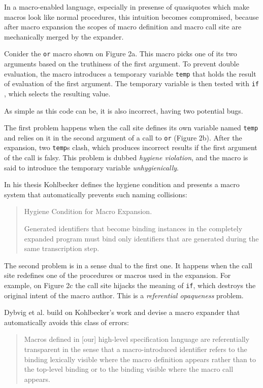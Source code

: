 \documentclass[10pt,journal,a4paper]{IEEEtran}
\begin{document}
In a macro-enabled language, especially in presense of quasiquotes which make
macros look like normal procedures, this intuition becomes compromised,
because after macro expansion the scopes of macro definition and macro call site
are mechanically merged by the expander.

Conider the \small \texttt{or} \normalsize macro shown on Figure 2a. This macro picks one of its two arguments
based on the truthiness of the first argument. To prevent double evaluation, the macro introduces
a temporary variable \small \texttt{temp} \normalsize that holds the result of evaluation of the first argument.
The temporary variable is then tested with \small \texttt{if} \normalsize, which selects the resulting value.

As simple as this code can be, it is also incorrect, having two potential bugs.

The first problem happens when the call site defines its own variable named \small \texttt{temp} \normalsize
and relies on it in the second argument of a call to \small \texttt{or} \normalsize (Figure 2b).
After the expansion, two \small \texttt{temp}\normalsize s clash,
which produces incorrect results if the first argument of the call is falsy.
This problem is dubbed \emph{hygiene violation}, and the macro is said to introduce the temporary
variable \emph{unhygienically}.

In his thesis \cite{kohlbecker86} Kohlbecker defines the hygiene condition
and presents a macro system that automatically prevents such naming collisions:
\begin{quote}
Hygiene Condition for Macro Expansion.

Generated identifiers that become binding instances in the
completely expanded program must bind only identifiers that are
generated during the same transcription step.
\end{quote}

The second problem is in a sense dual to the first one. It happens when the call site
redefines one of the procedures or macros used in the expansion. For example, on Figure 2c
the call site hijacks the meaning of \small \texttt{if}\normalsize, which destroys the original intent of the
macro author. This is a \emph{referential opaqueness} problem.

Dybvig et al. \cite{dybvig92} build on Kohlbecker's work and devise a macro expander that
automatically avoids this class of errors:
\begin{quote}
Macros defined in [our] high-level specification language are
referentially transparent in the sense that a macro-introduced
identifier refers to the binding lexically visible where the macro
definition appears rather than to the top-level binding or to the
binding visible where the macro call appears.
\end{quote}
\end{document}
